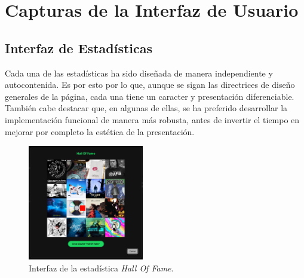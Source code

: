 \chapter{Capturas de la Interfaz de Usuario} \label{ch:anexoA}

\section{Interfaz de Estadísticas}

Cada una de las estadísticas ha sido diseñada de manera independiente y autocontenida. Es por esto por lo que, aunque se sigan las directrices de diseño generales de la página, cada una tiene un caracter y presentación diferenciable. También cabe destacar que, en algunas de ellas, se ha preferido desarrollar la implementación funcional de manera más robusta, antes de invertir el tiempo en mejorar por completo la estética de la presentación.

\begin{figure}[H]
    \centering
    \includegraphics[width=0.45\textwidth]{figures/capturas_ui/hall_of_fame.png}
    \caption{Interfaz de la estadística \textit{Hall Of Fame}.}
    \label{fig:hall_of_fame}
\end{figure}

